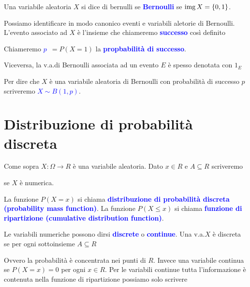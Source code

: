 \documentclass[10pt,openany]{book}
\def\0{\varnothing}
\def\range{\mathop{\rm img}}
\def\emph#1{\textcolor{blue}{\textbf{\boldmath #1}}}
\theoremstyle{mio}
\theoremstyle{liscio}
\begin{document}
Una variabile aleatoria $X$ si dice di bernulli se \emph{Bernoulli\/} se $\range X=\{0,1\}$.

Possiamo identificare in modo canonico eventi e variabili aletorie di Bernoulli. L'evento associato ad $X$ è l'insieme che chiameremo \emph{successo\/} così definito


Chiameremo \emph{$p$}\ $ = P(X=1)$ la \emph{propbabilità di successo}.

Viceversa, la v.a.\@ di Bernoulli associata ad un evento $E$ è spesso denotata con $1_E$


Per dire che $X$ è una variabile aleatoria di Bernoulli con probabilità di successo $p$ scriveremo \emph{$X\sim B(1,p)$}.

\clearpage\section{Distribuzione di probabilità discreta}

Come sopra $X:\Omega\to R$ è una variabile aleatoria. Dato $x\in R$ e $A\subseteq R$ scriveremo

\ceq{\hfill \emph{$p_x$}\medrel{=}\emph{$P(X=x)$}}{=}{P\big(\{\omega\in\Omega\ :\ X(\omega)=x)\}\big)}

\ceq{\hfill \emph{$P(X\in A)$}}{=}{P\big(\{\omega\in\Omega\ :\ X(\omega)\in A)\}\big)}

\ceq{\hfill \emph{$P(X \le x$)}}{=}{P\big(\{\omega\in\Omega\ :\ X(\omega)\le x)\}\big)}\hfill  se $X$ \`e numerica.

La funzione $P(X=x)$ si chiama \emph{distribuzione di probabilità discreta (probability mass function)}. La funzione $P(X \le x)$ si chiama  \emph{funzione di ripartizione (cumulative distribution function)}.

Le variabili numeriche possono dirsi \emph{discrete\/} o \emph{continue}. Una v.a.\@ $X$ è discreta se per ogni sottoinsieme $A\subseteq R$


Ovvero la probabilità è concentrata nei punti di $R$. Invece una variabile continua se $P(X=x)=0$ per ogni $x\in R$. Per le variabili continue tutta l'informazione è contenuta nella funzione di ripartizione possiamo solo scrivere
\end{document}
